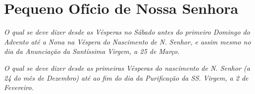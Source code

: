 \section{Pequeno Ofício de Nossa Senhora}



















\emph{O qual se deve dizer desde as Vésperas no Sábado antes do primeiro Domingo do Advento até a Nona na Véspera do Nascimento de N. Senhor, e assim mesmo no dia da Anunciação da Santíssima Virgem, a 25 de Março.}\par

















\emph{O qual se deve dizer desde as primeiras Vésperas do nascimento de N. Senhor (a 24 do mês de Dezembro) até ao fim do dia da Purificação da SS. Virgem, a 2 de Fevereiro.}\par






